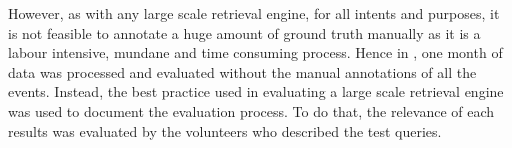 However, as with any large scale retrieval engine, for all intents and purposes, it is not feasible to annotate a huge amount of ground truth manually as it is a labour intensive, mundane and time consuming process. Hence in \versionTwoRet, one month of data was processed and evaluated without the manual annotations of all the events. Instead, the best practice used in evaluating a large scale retrieval engine was used to document the evaluation process. To do that, the relevance of each results was evaluated by the volunteers who described the test queries. 

